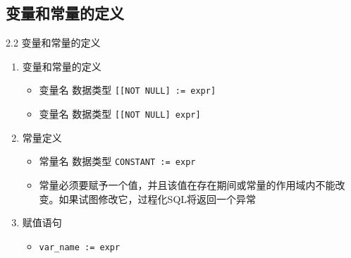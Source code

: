 \subsection{变量和常量的定义}
\begin{frame}{2.2 变量和常量的定义}
\begin{enumerate}
    \item 变量和常量的定义
    \begin{itemize}
        \item 变量名 数据类型 \lstinline{[[NOT NULL] := expr]}
        \item 变量名 数据类型 \lstinline{[[NOT NULL] expr]}
    \end{itemize}
    \item 常量定义
    \begin{itemize}
        \item 常量名 数据类型 \lstinline{CONSTANT := expr}
        \item 常量必须要赋予一个值，并且该值在存在期间或常量的作用域内不能改变。如果试图修改它，过程化SQL将返回一个异常
    \end{itemize}
    \item 赋值语句
    \begin{itemize}
    \item \lstinline{var_name := expr}
    \end{itemize}
\end{enumerate}
\end{frame}



